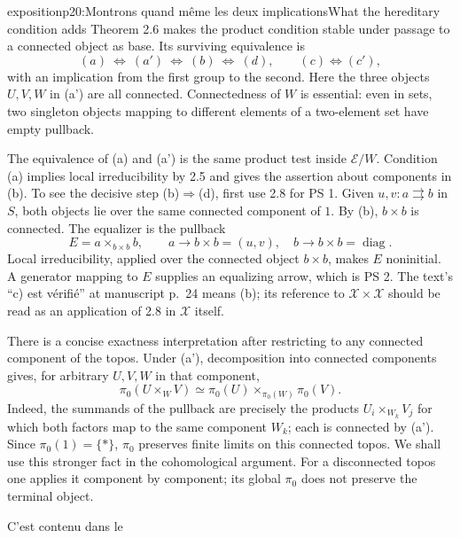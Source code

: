 \begin{dcomment}{exposition}{p20:Montrons quand même les deux implications}{What the hereditary condition adds}
Theorem 2.6 makes the product condition stable under passage to a connected object as base. Its surviving equivalence is
\[
 (a)\ \Longleftrightarrow\ (a')\ \Longleftrightarrow\ (b)
 \ \Longleftrightarrow\ (d),
 \qquad (c)\Longleftrightarrow(c'),
\]
with an implication from the first group to the second. Here the three objects $U,V,W$ in (a') are all connected. Connectedness of $W$ is essential: even in sets, two singleton objects mapping to different elements of a two-element set have empty pullback.

The equivalence of (a) and (a') is the same product test inside $\mathcal E/W$. Condition (a) implies local irreducibility by 2.5 and gives the assertion about components in (b). To see the decisive step (b)$\Rightarrow$(d), first use 2.8 for PS 1. Given $u,v:a\rightrightarrows b$ in $S$, both objects lie over the same connected component of $1$. By (b), $b\times b$ is connected. The equalizer is the pullback
\[
 E=a\times_{b\times b}b,
 \qquad a\longrightarrow b\times b=(u,v),\quad
 b\longrightarrow b\times b=\operatorname{diag}.
\]
Local irreducibility, applied over the connected object $b\times b$, makes $E$ noninitial. A generator mapping to $E$ supplies an equalizing arrow, which is PS 2. The text's ``c) est vérifié'' at manuscript p.~24 means (b); its reference to $\mathcal X\times\mathcal X$ should be read as an application of 2.8 in $\mathcal X$ itself.

There is a concise exactness interpretation after restricting to any connected component of the topos. Under (a'), decomposition into connected components gives, for arbitrary $U,V,W$ in that component,
\[
 \pi _0(U\times_WV)
 \simeq\pi _0(U)\times_{\pi _0(W)}\pi _0(V).
\]
Indeed, the summands of the pullback are precisely the products $U_i\times_{W_k}V_j$ for which both factors map to the same component $W_k$; each is connected by (a'). Since $\pi _0(1)=\{*\}$, $\pi _0$ preserves finite limits on this connected topos. We shall use this stronger fact in the cohomological argument. For a disconnected topos one applies it component by component; its global $\pi _0$ does not preserve the terminal object.
\end{dcomment}



\noindent C'est contenu dans le

